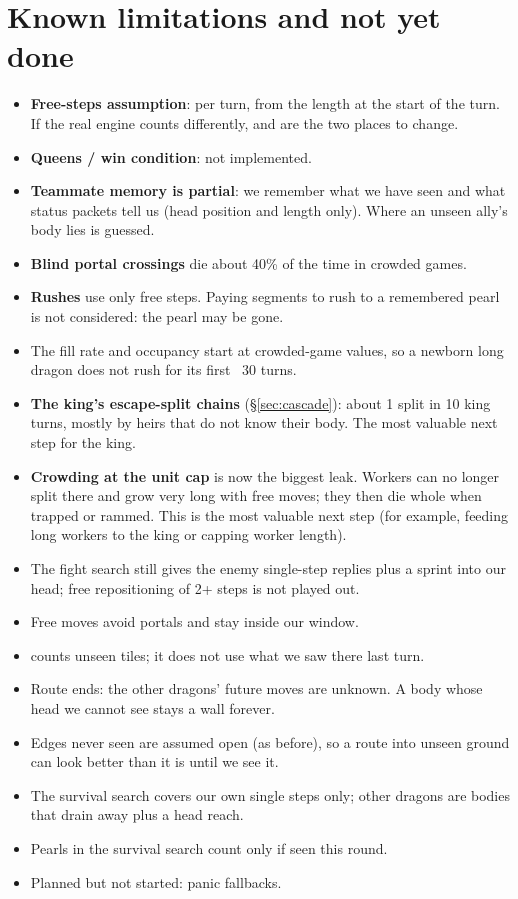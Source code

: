 \documentclass[11pt,a4paper]{article}
\newcommand{\code}[1]{\texttt{\detokenize{#1}}}
\begin{document}
\section{Known limitations and not yet done}
\begin{itemize}
  \item \textbf{Free-steps assumption}: per turn, from the length at the start of the turn. If the real engine counts differently,
        \code{free_moves} and \code{engine.py} are the two places to change.
  \item \textbf{Queens / win condition}: not implemented.
  \item \textbf{Teammate memory is partial}: we remember what we have seen and what status packets tell us (head position and
        length only). Where an unseen ally's body lies is guessed.
  \item \textbf{Blind portal crossings} die about 40\% of the time in crowded games.
  \item \textbf{Rushes} use only free steps. Paying segments to rush to a remembered pearl is not considered: the pearl may be gone.
  \item The fill rate and occupancy start at crowded-game values, so a newborn long dragon does not rush for its first ~30 turns.
  \item \textbf{The king's escape-split chains} (\S\ref{sec:cascade}): about 1 split in 10 king turns, mostly by heirs
        that do not know their body. The most valuable next step for the king.
  \item \textbf{Crowding at the unit cap} is now the biggest leak. Workers can no longer split there and grow very long with free moves;
        they then die whole when trapped or rammed. This is the most valuable next step (for example, feeding long workers to the king
        or capping worker length).
  \item The fight search still gives the enemy single-step replies plus a sprint into our head; free repositioning of 2+ steps is not played out.
  \item Free moves avoid portals and stay inside our window.
  \item \code{unseen_risk} counts unseen tiles; it does not use what we saw there last turn.
  \item Route ends: the other dragons' future moves are unknown. A body whose head we cannot see stays a wall forever.
  \item Edges never seen are assumed open (as before), so a route into unseen ground can look better than it is until we see it.
  \item The survival search covers our own single steps only; other dragons are bodies that drain away plus a head reach.
  \item Pearls in the survival search count only if seen this round.
  \item Planned but not started: panic fallbacks.
\end{itemize}
\end{document}
